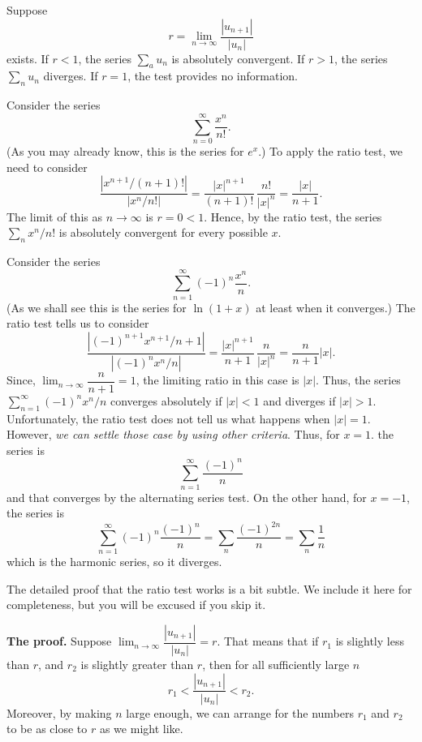   Suppose
$$
r = \lim_{n\to\infty} \frac {|u_{n+1}|}{|u_n|}
$$
exists.  If $r < 1$, the series $\sum_a u_n$ is absolutely
convergent.  If $r > 1$, the series $\sum_n u_n$ diverges.
If $r = 1$, the test provides no information.
\endproclaim
{}%

\nextex
{}
Consider the series
$$
\sum_{n=0}^\infty \frac{x^n}{n!}.
$$
(As you may already know,
this is the series for $e^x$.)  To apply the ratio test, we
need to consider
$$
\frac{ |x^{n+1}/(n+1)!|}{|x^n/n!|} =
\frac{|x|^{n+1}}{(n+1)!}\,\frac{n!}{|x|^n} = \frac{|x|}{n+1}.
$$
The limit of this as $n \to \infty$ is $r = 0 < 1$.  Hence, by the
ratio test, the series $\sum_n x^n/n!$ is absolutely convergent
for every possible $x$.
\endexample

\nextex
{}  Consider the series
$$
\sum_{n=1}^\infty (-1)^n \frac {x^n}n.
$$
(As we shall see this is the series for $\ln(1 + x)$ at least when
it converges.)  The ratio test tells us to consider
$$
\frac{|(-1)^{n+1}x^{n+1}/n+1|}{|(-1)^nx^n/n|}
= \frac{|x|^{n+1}}{n+1}\,\frac n{|x|^n} = \frac n{n+1} |x|.
$$
Since, $\lim_{n\to\infty}\dfrac n{n+1} = 1$, the limiting ratio
in this case is $|x|$.  Thus, the series $\sum_{n=1}^\infty
(-1)^nx^n/n$ converges absolutely if $|x| < 1$ and diverges
if $|x| > 1$.   Unfortunately, the ratio test does not tell
us what happens when $|x| = 1$.    However, {\it we can settle
those case by using other criteria}.  Thus, for $x = 1$.
the series is
$$
\sum_{n=1}^\infty \frac{(-1)^n}n
$$
and that converges by the alternating series test.  On the other
hand, for $x = -1$, the series is
$$\sum_{n=1}^\infty (-1)^n \frac{(-1)^n}n = \sum_n\frac{(-1)^{2n}}n
= \sum_n \frac 1n
$$
which is the harmonic series, so it diverges.
\endexample

The detailed proof that the ratio test works is a bit subtle.  We
include it here for completeness, but you will be excused if you
skip it.

{\bf The proof.}
Suppose $\lim_{n\to\infty}\dfrac{|u_{n+1}|}{|u_n|} = r$.
That means that if $r_1$ is slightly less than $r$,
 and $r_2$ is slightly greater than $r$, then 
for all  sufficiently large $n$
$$
     r_1 < \frac{|u_{n+1}|}{|u_n|} < r_2.
$$
Moreover, by making $n$ large enough, we can arrange for the
numbers $r_1$ and $r_2$ to be as close to $r$ as we might like.


